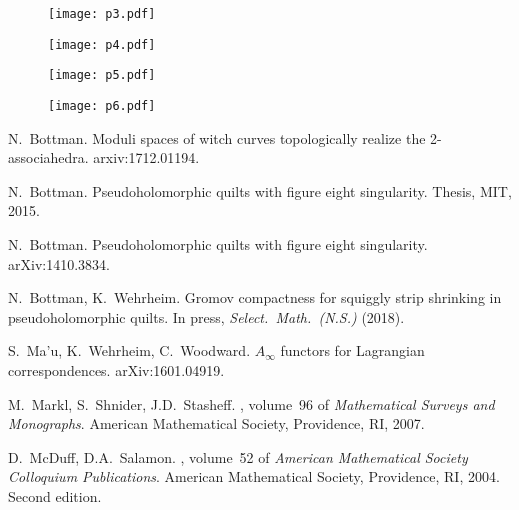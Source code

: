 \documentclass[11pt]{amsart}
\theoremstyle{definition}
\theoremstyle{remark}
\theoremstyle{plain}
\begin{document}
\newpage

\begin{figure}[H]
\centering
\texttt{[image: p3.pdf]}
\end{figure}

\newpage

\begin{figure}[H]
\centering
\texttt{[image: p4.pdf]}
\end{figure}

\newpage

\begin{figure}[H]
\centering
\texttt{[image: p5.pdf]}
\end{figure}

\newpage

\begin{figure}[H]
\centering
\texttt{[image: p6.pdf]}
\end{figure}

\begin{thebibliography}{10}

N.~Bottman.
\newblock Moduli spaces of witch curves topologically realize the 2-associahedra.
\newblock arxiv:1712.01194.

N.~Bottman.
\newblock Pseudoholomorphic quilts with figure eight singularity.
\newblock Thesis, MIT, 2015.

N.~Bottman.
\newblock Pseudoholomorphic quilts with figure eight singularity.
\newblock arXiv:1410.3834.

N.~Bottman, K.~Wehrheim.
\newblock Gromov compactness for squiggly strip shrinking in pseudoholomorphic quilts.
\newblock In press, {\it Select.\ Math.\ (N.S.)} (2018).

S.~Ma'u, K.~Wehrheim, C.~Woodward.
\newblock $A_\infty$ functors for Lagrangian correspondences.
\newblock arXiv:1601.04919.

M.~Markl, S.~Shnider, J.D.~Stasheff.
, volume~96 of {\em  Mathematical Surveys and Monographs}.
\newblock American Mathematical Society, Providence, RI, 2007.

D.~McDuff, D.A.~Salamon.
, volume~52 of
  {\em American Mathematical Society Colloquium Publications}.
\newblock American Mathematical Society, Providence, RI, 2004.  Second edition.


\end{thebibliography}
\end{document}
